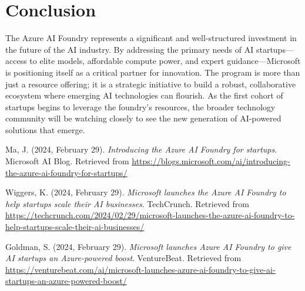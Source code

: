 \documentclass[11pt, a4paper]{article}
\begin{document}
\section{Conclusion}
The Azure AI Foundry represents a significant and well-structured investment in the future of the AI industry. By addressing the primary needs of AI startups—access to elite models, affordable compute power, and expert guidance—Microsoft is positioning itself as a critical partner for innovation. The program is more than just a resource offering; it is a strategic initiative to build a robust, collaborative ecosystem where emerging AI technologies can flourish. As the first cohort of startups begins to leverage the foundry's resources, the broader technology community will be watching closely to see the new generation of AI-powered solutions that emerge.

\begin{thebibliography}{9}

Ma, J. (2024, February 29). \textit{Introducing the Azure AI Foundry for startups}. Microsoft AI Blog. Retrieved from \url{https://blogs.microsoft.com/ai/introducing-the-azure-ai-foundry-for-startups/}

Wiggers, K. (2024, February 29). \textit{Microsoft launches the Azure AI Foundry to help startups scale their AI businesses}. TechCrunch. Retrieved from \url{https://techcrunch.com/2024/02/29/microsoft-launches-the-azure-ai-foundry-to-help-startups-scale-their-ai-businesses/}

Goldman, S. (2024, February 29). \textit{Microsoft launches Azure AI Foundry to give AI startups an Azure-powered boost}. VentureBeat. Retrieved from \url{https://venturebeat.com/ai/microsoft-launches-azure-ai-foundry-to-give-ai-startups-an-azure-powered-boost/}

\end{thebibliography}
\end{document}
